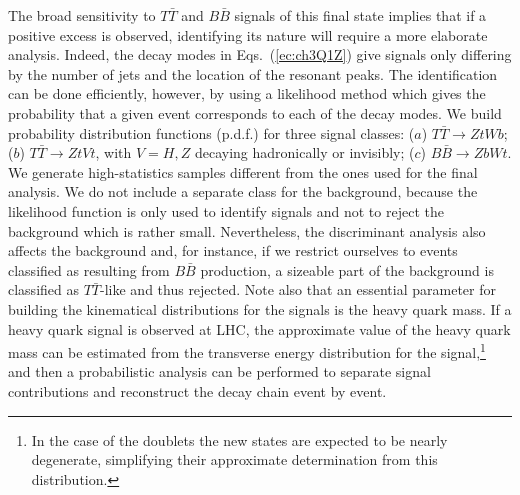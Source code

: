 \documentclass[12pt,a4paper]{article}
\newcommand{\TT}{T \bar T}
\newcommand{\BB}{B \bar B}
\newcommand{\HZ}{V}
\begin{document}
The broad sensitivity to $\TT$ and $\BB$ signals of this final state implies that if a positive excess is observed, identifying its nature will require a more elaborate analysis. Indeed, the decay modes in Eqs.~(\ref{ec:ch3Q1Z}) give signals only differing by the number of jets and the location of the resonant peaks. The identification can be done efficiently, however, by using a likelihood method which gives the probability that a given event corresponds to each of the decay modes. 
We build probability distribution functions (p.d.f.) for three signal classes: ($a$) $\TT \to ZtWb$; ($b$) $\TT \to Zt \HZ t$, with $\HZ=H,Z$ decaying hadronically or invisibly; ($c$) $\BB \to Zb Wt$. We generate high-statistics samples different from the ones used for the final analysis. We do not include a separate class for the background, because the likelihood function is only used to identify signals and not to reject the background which is rather small. Nevertheless, the discriminant analysis also affects the background and, for instance, if we restrict ourselves to events
classified as resulting from $\BB$ production, a sizeable part of the background is classified as $\TT$-like and thus rejected.
Note also that an essential parameter for building the kinematical distributions for the signals is the heavy quark mass. If a heavy quark signal is observed at LHC, the approximate value of the heavy quark mass can be estimated from the transverse energy distribution for the signal,\footnote{In the case of the doublets the new states are expected to be nearly degenerate, simplifying their approximate determination from this distribution.}  and then a probabilistic analysis can be performed to separate signal contributions and reconstruct the decay chain event by event.
\end{document}
